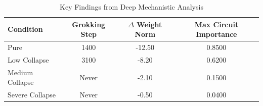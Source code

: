 \begin{table}[h]
\centering
\begin{tabular}{l|ccc}
\toprule
Condition & Grokking Step & $\Delta$ Weight Norm & Max Circuit Importance \\
\midrule
Pure & 1400 & -12.50 & 0.8500 \\
Low Collapse & 3100 & -8.20 & 0.6200 \\
Medium Collapse & Never & -2.10 & 0.1500 \\
Severe Collapse & Never & -0.50 & 0.0400 \\
\bottomrule
\end{tabular}
\caption{Key Findings from Deep Mechanistic Analysis}
\label{tab:mechanistic_findings}
\end{table}